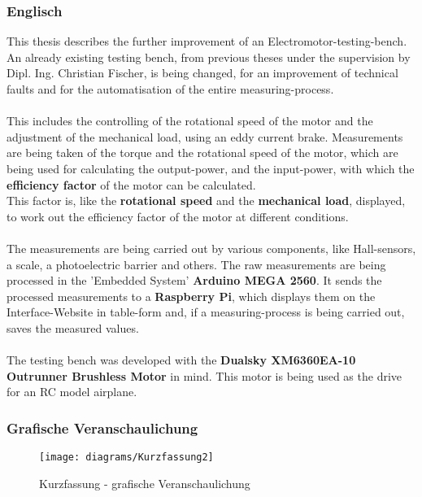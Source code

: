 \documentclass[12pt,a4paper]{article}
\begin{document}
\subsubsection*{Englisch}
  This thesis describes the further improvement of an Electromotor-testing-bench.\\
  An already existing testing bench, from previous theses under the supervision by Dipl. Ing. Christian Fischer, 
  is being changed, for an improvement of technical faults and for the automatisation of the entire measuring-process.\\\\
  This includes the controlling of the rotational speed of the motor and the adjustment of the mechanical load, using an
  eddy current brake.
%
  Measurements are being taken of the torque and the rotational speed of the motor, which are being used for calculating
  the output-power, and the input-power, with which the {\bf efficiency factor} of the motor can be calculated. \\
  This factor is, like the {\bf rotational speed} and the {\bf mechanical load}, displayed, to work out the efficiency factor
  of the motor at different conditions. \\\\
%
  The measurements are being carried out by various components, like Hall-sensors, a scale, a photoelectric barrier and others.
  The raw measurements are being processed in the 'Embedded System' {\bf Arduino MEGA 2560}.
  It sends the processed measurements to a {\bf Raspberry Pi}, which displays them on the Interface-Website in table-form 
  and, if a measuring-process is being carried out, saves the measured values. \\\\
%
  The testing bench was developed with the {\bf Dualsky XM6360EA-10 Outrunner Brushless Motor} in mind.
  This motor is being used as the drive for an RC model airplane.
%
%
\newpage
\subsubsection*{Grafische Veranschaulichung}
\begin{figure}[h!]
\centering
\texttt{[image: diagrams/Kurzfassung2]}
\caption{Kurzfassung - grafische Veranschaulichung}
\end{figure}
%
%
\newpage
\end{document}
